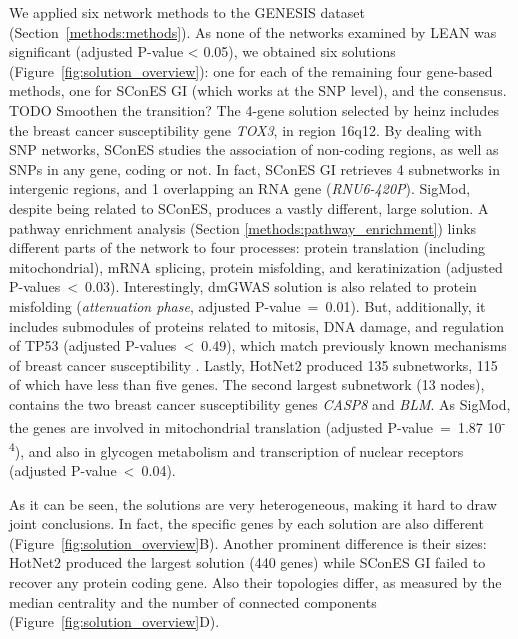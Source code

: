 \documentclass[twocolumn, 11pt]{article}
\begin{document}
We applied six network methods to the GENESIS dataset (Section~\ref{methods:methods}). As none of the networks examined by LEAN was significant (adjusted P-value < 0.05), we obtained six solutions (Figure~\ref{fig:solution_overview}): one for each of the remaining four gene-based methods, one for SConES GI (which works at the SNP level), and the consensus. TODO Smoothen the transition? The 4-gene solution selected by heinz includes the breast cancer susceptibility gene \emph{TOX3}, in region 16q12. By dealing with SNP networks, SConES studies the association of non-coding regions, as well as SNPs in any gene, coding or not. In fact, SConES GI retrieves 4 subnetworks in intergenic regions, and 1 overlapping an RNA gene (\emph{RNU6-420P}). SigMod, despite being related to SConES, produces a vastly different, large solution. A pathway enrichment analysis (Section \ref{methods:pathway_enrichment}) links different parts of the network to four processes: protein translation (including mitochondrial), mRNA splicing, protein misfolding, and keratinization (adjusted P-values~<~0.03). Interestingly, dmGWAS solution is also related to protein misfolding (\emph{attenuation phase}, adjusted P-value~=~0.01). But, additionally, it includes submodules of proteins related to mitosis, DNA damage, and regulation of TP53 (adjusted P-values~<~0.49), which match previously known mechanisms of breast cancer susceptibility \cite{nielsen_hereditary_2016}. Lastly, HotNet2 produced 135 subnetworks, 115 of which have less than five genes. The second largest subnetwork (13 nodes), contains the two breast cancer susceptibility genes \emph{CASP8} and \emph{BLM}. As SigMod, the genes are involved in mitochondrial translation (adjusted P-value~=~1.87 \texttimes{} 10\textsuperscript{-4}), and also in glycogen metabolism and transcription of nuclear receptors (adjusted P-value~<~0.04).

As it can be seen, the solutions are very heterogeneous, making it hard to draw joint conclusions. In fact, the specific genes by each solution are also different (Figure~\ref{fig:solution_overview}B). Another prominent difference is their sizes: HotNet2 produced the largest solution (440 genes) while SConES GI failed to recover any protein coding gene. Also their topologies differ, as measured by the median centrality and the number of connected components (Figure~\ref{fig:solution_overview}D). 
\end{document}
